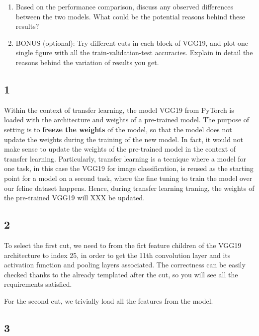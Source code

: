 \documentclass[11pt]{scrartcl}
\begin{document}
\begin{enumerate}
	\item Based on the performance comparison, 
	discuss any observed differences between the two models. 
	What could be the potential reasons behind these results?

	\item BONUS (optional): Try different cuts in each block of VGG19, 
	and plot one single figure with all the train-validation-test accuracies. 
	Explain in detail the reasons behind the variation of results you get.
\end{enumerate}


\subsection*{1}

Within the context of transfer learning, the model VGG19 from PyTorch 
is loaded with the architecture and weights of a pre-trained model.
The purpose of setting  
is to \textbf{freeze the weights} of the model,
so that the model does not update the weights during the training of the new model.
In fact, it would not make sense to update the weights of the pre-trained model
in the context of transfer learning.
Particularly, transfer learning is a tecnique where a model for one task,
in this case the VGG19 for image classification, 
is reused as the starting point for a model on a second task,
where the fine tuning to train the model over our feline dataset happens.
Hence, during transfer learning traning, 
the weights of the pre-trained VGG19 will XXX be updated.


\subsection*{2}

To select the first cut, we need to from the firt feature children of the 
VGG19 architecture to index 25, in order to get the 11th convolution layer 
and its activation function and pooling layers associated.
The correctness can be easily checked thanks to the already templated 
after the cut, so you will see all the requirements satisfied.

For the second cut, we trivially load all the features from the model.


\subsection*{3}
\end{document}
